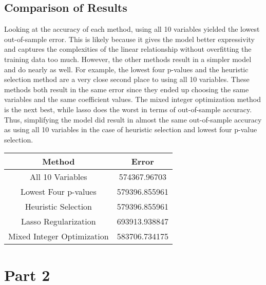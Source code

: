\documentclass[15pt,a4paper,openright]{article}
\begin{document}
\subsection{Comparison of Results}

Looking at the accuracy of each method, using all 10 variables yielded the lowest out-of-sample error. This is likely because it gives the model better expressivity and captures the complexities of the linear relationship without overfitting the training data too much. However, the other methods result in a simpler model and do nearly as well. For example, the lowest four p-values and the heuristic selection method are a very close second place to using all 10 variables. These methods both result in the same error since they ended up choosing the same variables and the same coefficient values. The mixed integer optimization method is the next best, while lasso does the worst in terms of out-of-sample accuracy. Thus, simplifying the model did result in almost the same out-of-sample accuracy as using all 10 variables in the case of heuristic selection and lowest four p-value selection. 

\begin{center}
 \begin{tabular}{||c | c||} 
 \hline
 Method & Error  \\ [0.5ex] 
 \hline\hline
 All 10 Variables & 574367.96703 \\
 Lowest Four p-values & 579396.855961 \\
 Heuristic Selection & 579396.855961   \\
 Lasso Regularization & 693913.938847 \\
 Mixed Integer Optimization & 583706.734175 \\
 [1ex] 
 \hline
\end{tabular}
\end{center}


\newpage{}
\section{Part 2}

\vspace{4mm}
\end{document}
